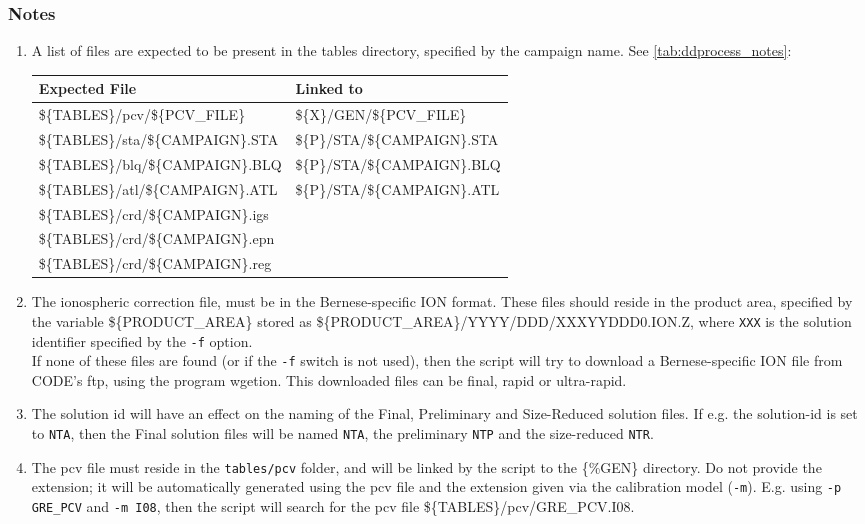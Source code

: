 \subsubsection{Notes}\label{sec:ddprocess_notes}
\begin{enumerate}[label=\arabic*]
\item A list of files are expected to be present in the tables directory, specified by
the campaign name. See \autoref{tab:ddprocess_notes}:

\begin{tabular}{l | l}\label{tab:ddprocess_notes}
Expected File & Linked to\\
\hline
 \$\{TABLES\}/pcv/\$\{PCV\_FILE\}       & \$\{X\}/GEN/\$\{PCV\_FILE\} \\
 \$\{TABLES\}/sta/\$\{CAMPAIGN\}.STA    & \$\{P\}/STA/\$\{CAMPAIGN\}.STA\\
 \$\{TABLES\}/blq/\$\{CAMPAIGN\}.BLQ    & \$\{P\}/STA/\$\{CAMPAIGN\}.BLQ\\
 \$\{TABLES\}/atl/\$\{CAMPAIGN\}.ATL    & \$\{P\}/STA/\$\{CAMPAIGN\}.ATL\\
 \$\{TABLES\}/crd/\$\{CAMPAIGN\}.igs    & \\
 \$\{TABLES\}/crd/\$\{CAMPAIGN\}.epn    & \\
 \$\{TABLES\}/crd/\$\{CAMPAIGN\}.reg    & \\
\hline
\end{tabular}
\item The ionospheric correction file, must be in the Bernese-specific ION format.
These files should reside in the product area, specified by the variable \$\{PRODUCT\_AREA\}
stored as \$\{PRODUCT\_AREA\}/YYYY/DDD/XXXYYDDD0.ION.Z, where \texttt{XXX} is the solution identifier
specified by the \texttt{-f} option.\\
If none of these files are found (or if the \texttt{-f} switch is not used), then the script
will try to download a Bernese-specific ION file from CODE's ftp, using the program
wgetion. This downloaded files can be final, rapid or ultra-rapid.
\item The solution id will have an effect on the naming of the Final, Preliminary
and Size-Reduced solution files. If e.g. the solution-id is set to \texttt{NTA}, then
the Final solution files will be named \texttt{NTA}, the preliminary \texttt{NTP} 
and the size-reduced \texttt{NTR}.
\item The pcv file must reside in the \texttt{tables/pcv} folder, and will be linked by the
script to the \{\%GEN\} directory. Do not provide the extension; it will be automatically
generated using the pcv file and the extension given via the calibration model (\texttt{-m}).
E.g. using \texttt{-p GRE\_PCV} and \texttt{-m I08}, then the script will search for the pcv file
\$\{TABLES\}/pcv/GRE\_PCV.I08.
\end{enumerate}